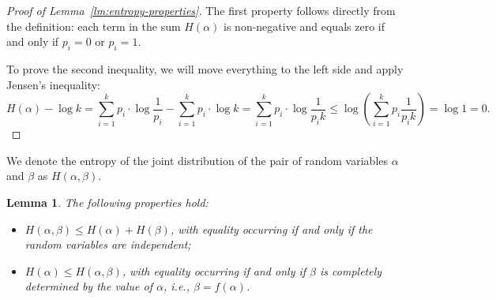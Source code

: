 \documentclass[12pt,sans]{article}
\theoremstyle{definition}
\theoremstyle{plain}
\newtheorem{lemma}{Lemma}[section]
\theoremstyle{remark}
\begin{document}
\begin{proof}[Proof of Lemma~\ref{lm:entropy-properties}]
    The first property follows directly from the definition: each term in the sum \(H(\alpha)\) is non-negative and equals zero if and only if \(p_i = 0\) or \(p_i = 1\).

    To prove the second inequality, we will move everything to the left side and apply Jensen's inequality:
    \[
    H(\alpha) - \log k
    = \sum_{i=1}^k p_i \cdot \log \frac{1}{p_i} - \sum_{i=1}^k p_i \cdot \log k
    = \sum_{i=1}^k p_i \cdot \log \frac{1}{p_i k}
    \le \log\left(\sum_{i=1}^k p_i \frac{1}{p_i k}\right) = \log 1 = 0.
    \]
\end{proof}

We denote the entropy of the joint distribution of the pair of random variables \(\alpha\) and \(\beta\) as \(H(\alpha, \beta)\).
\begin{lemma}
    The following properties hold:
    \begin{itemize}
        \item \(H(\alpha, \beta) \le H(\alpha) + H(\beta)\), with equality occurring if and only if the random variables are independent;
        \item \(H(\alpha) \le H(\alpha, \beta)\), with equality occurring if and only if \(\beta\) is completely determined by the value of \(\alpha\), i.e., \(\beta = f(\alpha)\).
    \end{itemize}
\end{lemma}
\end{document}

